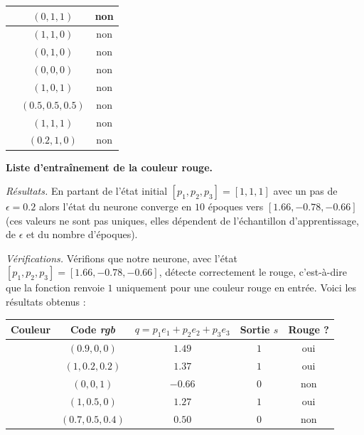 \documentclass[10pt,class=report,crop=false]{standalone}
\begin{document}
\begin{activite}[Neurone]
\begin{enumerate}
\begin{center}
\begin{tabular}{|c|c|c|}
	\cellcolor{notred1}  & $(0,1,1)$ & non \\ \hline
	\cellcolor{notred2}  & $(1,1,0)$ & non \\ \hline
	\cellcolor{notred3}  & $(0,1,0)$ & non \\ \hline
	\cellcolor{notred4}  & $(0,0,0)$ & non \\ \hline  
	\cellcolor{notred5}  & $(1,0,1)$ & non \\ \hline
	\cellcolor{notred6}  & $(0.5,0.5,0.5)$ & non \\ \hline
	\cellcolor{notred7}  & $(1,1,1)$ & non \\ \hline	
	\cellcolor{notred8}  & $(0.2,1,0)$ & non \\ \hline	
\end{tabular}


{\bf Liste d'entraînement de la couleur rouge.}
\end{center} 

\medskip

	\emph{Résultats.} En partant de l'état initial $[p_1,p_2,p_3]=[1,1,1]$ avec un pas de $\epsilon=0.2$
	alors l'état du neurone converge en $10$ époques vers $[1.66,-0.78,-0.66]$
	(ces valeurs ne sont pas uniques, elles dépendent de l'échantillon d'apprentissage, de $\epsilon$ et du nombre d'époques).
	
	
	
\medskip
	
	\emph{Vérifications.}
	Vérifions que notre neurone, avec l'état $[p_1,p_2,p_3]=[1.66,-0.78,-0.66]$, détecte correctement le rouge, c'est-à-dire que la fonction  renvoie $1$ uniquement pour une couleur rouge en entrée. Voici les résultats obtenus :

	
\begin{center}
	\begin{tabular}{|c|c|c|c|c|}
		\hline
		Couleur &  Code \emph{rgb}  &  $q=p_1 e_1 + p_2e_2+p_3e_3$ & Sortie $s$ & Rouge ?\\ \hline\hline
		
		\cellcolor{isred1}  & $(0.9,0,0)$ & $1.49$ & $1$ & oui \\ \hline
		\cellcolor{isred2}  & $(1,0.2,0.2)$ & $1.37$ & $1$ & oui \\ \hline
		\cellcolor{isred3}  & $(0,0,1)$ & $-0.66$ & $0$ & non \\ \hline
		\cellcolor{isred4}  & $(1,0.5,0)$ & $1.27$ & $1$ & oui \\ \hline  
		\cellcolor{isred5}  & $(0.7,0.5,0.4)$ & $0.50$ & $0$ & non \\ \hline
         

\end{tabular}
\end{center}
\end{enumerate}
\end{activite}
\end{document}
